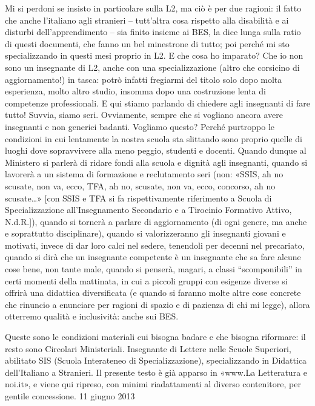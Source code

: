 Mi si perdoni se insisto in particolare sulla L2, ma ciò è per due ragioni: il fatto che anche l’italiano agli stranieri – tutt’altra cosa rispetto alla disabilità e ai disturbi dell’apprendimento – sia finito insieme ai BES, la dice lunga sulla ratio di questi documenti, che fanno un bel minestrone di tutto; poi perché mi sto specializzando in questi mesi proprio in L2. E che cosa ho imparato? Che io non sono un insegnante di L2, anche con una specializzazione (altro che corsicino di aggiornamento!) in tasca: potrò infatti fregiarmi del titolo solo dopo molta esperienza, molto altro studio, insomma dopo una costruzione lenta di competenze professionali. E qui stiamo parlando di chiedere agli insegnanti di fare tutto! Suvvia, siamo seri. Ovviamente, sempre che si vogliano ancora avere insegnanti e non generici badanti. Vogliamo questo? Perché purtroppo le condizioni in cui lentamente la nostra scuola sta slittando sono proprio quelle di luoghi dove sopravvivere alla meno peggio, studenti e docenti.
Quando dunque al Ministero si parlerà di ridare fondi alla scuola e dignità agli insegnanti, quando si lavorerà a un sistema di formazione e reclutamento seri (non: «SSIS, ah no scusate, non va, ecco, TFA, ah no, scusate, non va, ecco, concorso, ah no scusate…» [con SSIS e TFA si fa  rispettivamente riferimento a Scuola di Specializzazione all’Insegnamento Secondario e a Tirocinio Formativo Attivo, N.d.R.]), quando si tornerà a parlare di aggiornamento (di ogni genere, ma anche e soprattutto disciplinare), quando si valorizzeranno gli insegnanti giovani e motivati, invece di dar loro calci nel sedere, tenendoli per decenni nel precariato, quando si dirà che un insegnante competente è un insegnante che sa fare alcune cose bene, non tante male, quando si penserà, magari, a classi “scomponibili” in certi momenti della mattinata, in cui a piccoli gruppi con esigenze diverse si offrirà una didattica diversificata (e quando si faranno molte altre cose concrete che rinuncio a enunciare per ragioni di spazio e di pazienza di chi mi legge), allora otterremo qualità e inclusività: anche sui BES.

Queste sono le condizioni materiali cui bisogna badare e che bisogna riformare: il resto sono Circolari Ministeriali.
Insegnante di Lettere nelle Scuole Superiori, abilitato SIS (Scuola Interateneo di Specializzazione), specializzando in Didattica dell’Italiano a Stranieri. Il presente testo è già apparso in «www.La Letteratura e noi.it», e viene qui ripreso, con minimi riadattamenti al diverso contenitore, per gentile concessione.
11 giugno 2013
